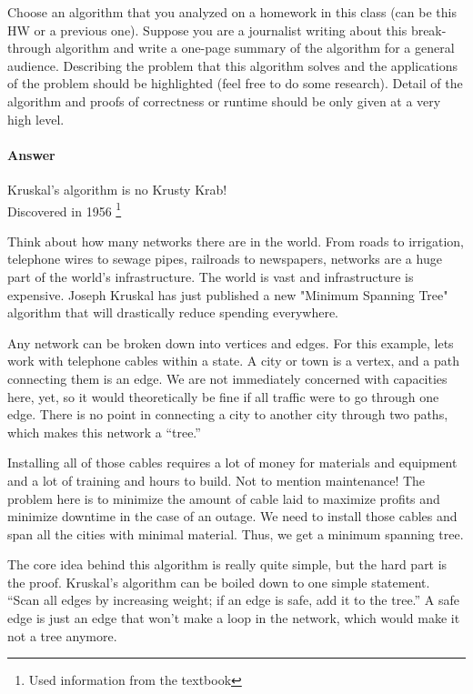 \documentclass{article}
\begin{document}

\collab{\todo{}}
\nextprob{}

Choose an algorithm that you analyzed on a homework in this class (can be this
HW or a previous one).  Suppose you are a journalist writing about this
break-through algorithm and write a one-page summary of the algorithm for a
general audience.  Describing the problem that this algorithm solves and the
applications of the problem should be highlighted (feel free to do some
research).  Detail of the algorithm and proofs of correctness or runtime should
be only given at a very high level.

\paragraph{Answer}

Kruskal's algorithm is no Krusty Krab!\\
Discovered in 1956 \footnote{Used information from the textbook}

Think about how many networks there are in the world. From roads to irrigation, telephone wires to sewage pipes, railroads to newspapers, networks are a huge part of the world's infrastructure. The world is vast and infrastructure is expensive. Joseph Kruskal has just published a new "Minimum Spanning Tree" algorithm that will drastically reduce spending everywhere.

Any network can be broken down into vertices and edges. For this example, lets work with telephone cables within a state. A city or town is a vertex, and a path connecting them is an edge. We are not immediately concerned with capacities here, yet, so it would theoretically be fine if all traffic were to go through one edge. There is no point in connecting a city to another city through two paths, which makes this network a “tree.”

Installing all of those cables requires a lot of money for materials and equipment and a lot of training and hours to build. Not to mention maintenance! The problem here is to minimize the amount of cable laid to maximize profits and minimize downtime in the case of an outage. We need to install those cables and span all the cities with minimal material. Thus, we get a minimum spanning tree.

The core idea behind this algorithm is really quite simple, but the hard part is the proof. Kruskal’s algorithm can be boiled down to one simple statement. “Scan all edges by increasing weight; if an edge is safe, add it to the tree.” A safe edge is just an edge that won’t make a loop in the network, which would make it not a tree anymore.
\end{document}
